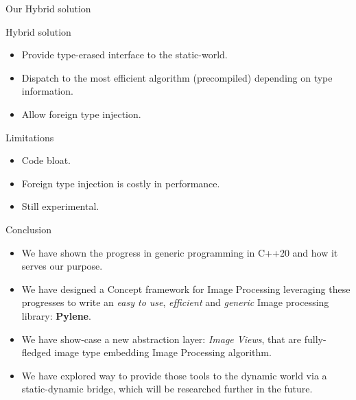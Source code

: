 \documentclass[12pt,aspectratio=169]{beamer}
\begin{document}
\begin{frame}{Our Hybrid solution}
  \begin{alertblock}{Hybrid solution}
    \begin{itemize}
      \item Provide type-erased interface to the static-world.
      \item Dispatch to the most efficient algorithm (precompiled) depending on type information.
      \item Allow foreign type injection.
    \end{itemize}
  \end{alertblock}
  \begin{alertblock}{Limitations}
    \begin{itemize}
      \item Code bloat.
      \item Foreign type injection is costly in performance.
      \item Still experimental.
    \end{itemize}
  \end{alertblock}
\end{frame}

\begin{frame}{Conclusion}
  \begin{itemize}
    \item We have shown the progress in generic programming in C++20 and how it serves our purpose.
    \item We have designed a Concept framework for Image Processing leveraging these progresses to write an \emph{easy
            to use}, \emph{efficient} and \emph{generic} Image processing library: \textbf{Pylene}.
    \item We have show-case a new abstraction layer: \emph{Image Views}, that are fully-fledged image type embedding
          Image Processing algorithm.
    \item We have explored way to provide those tools to the dynamic world via a static-dynamic bridge, which will be
          researched further in the future.
  \end{itemize}
\end{frame}
\end{document}
